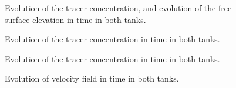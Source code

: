 \begin{figure}
\centering
{}
 \caption{Evolution of the tracer concentration, and evolution of the free surface elevation in time in both tanks.}\label{fig:siphon:evol}
\end{figure}

\begin{figure}
\centering
{}
 \caption{Evolution of the tracer concentration in time in both tanks.}\label{fig:siphon:evolbis}
\end{figure}

\begin{figure}
\centering
{}
 \caption{Evolution of the tracer concentration in time in both tanks.}\label{fig:siphon:evolbis2}
\end{figure}


\begin{figure}
\centering
{}
 \caption{Evolution of velocity field in time in both tanks.}\label{fig:siphon:evol_vel}
\end{figure}
